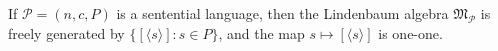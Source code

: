 If $\mathcal{P} = (n, c, P)$ is a sentential language, then the Lindenbaum algebra $\mathfrak{M}_{\mathcal{P}}$ is freely generated by $\{[\langle s \rangle] : s \in P\}$, and the map $s \mapsto [\langle s \rangle]$ is one-one.
